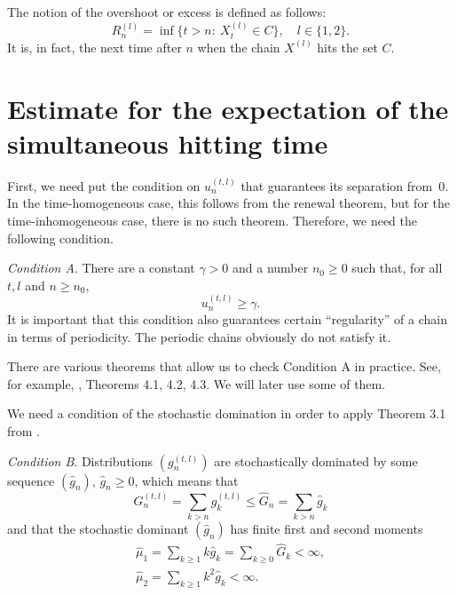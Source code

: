 \documentclass[numbers,compress,v1.0.1]{vmsta}
\newcommand{\lsum}{\sum\limits}
\theoremstyle{definition}
\begin{document}
The notion of the overshoot or excess is defined as follows:
%
\begin{equation}
R^{(l)}_n = \inf\bigl\{t>n:\ X^{(l)}_t
\in C\bigr\}, \quad l \in\{1,2\}.
\end{equation}
%
It is, in fact, the next time after $n$ when the chain $X^{(l)}$ hits
the set $C$.

\vspace*{-6pt}\section{Estimate for the expectation of the simultaneous hitting
time}\vspace*{-3pt}
First, we need put the condition on $u^{(t,l)}_n$ that guarantees its
separation from~0.
In the time-homogeneous case, this follows from the renewal theorem,
but for the time-inhomogeneous case, there is no such
theorem. Therefore, we need the following condition.

\textit{Condition A}.
There are a constant $\gamma> 0$ and a number $n_0\ge0$ such that,
for all $t,l$ and $n \ge n_0$,
%
\begin{equation}
u^{(t,l)}_n \ge\gamma.
\end{equation}
%
It is important that this condition also guarantees certain
``regularity'' of a chain in terms of periodicity. The periodic chains
obviously do not satisfy it.

There are various theorems that allow us to check Condition A in
practice. See, for example, \cite{CouplingExamples}, Theorems 4.1, 4.2,
4.3. We will later use some of them.

We need a condition of the stochastic domination in order to apply
Theorem 3.1 from \cite{Excess}.

\textit{Condition B}.
Distributions $(g^{(t,l)}_n)$ are stochastically dominated by some
sequence $(\hat g_n)$, $\hat g_n\ge0$, which means that
%
\begin{equation}
G^{(t,l)}_n = \lsum_{k > n} g^{(t,l)}_k
\le\hat G_n = \lsum_{k > n} \hat g_k
\end{equation}
%
and that the stochastic dominant $(\hat g_n)$ has finite first and
second moments
%
\begin{equation}
%
\begin{array}{c}
\displaystyle \hat\mu_1 = \lsum_{k \ge1} k \hat g_k = \lsum_{k\ge0} \hat G_k < \infty,\\[16pt]
\displaystyle \hat\mu_2 = \lsum_{k \ge1} k^2 \hat g_k < \infty.
\end{array} %
\end{equation}
\endgroup
\end{document}
